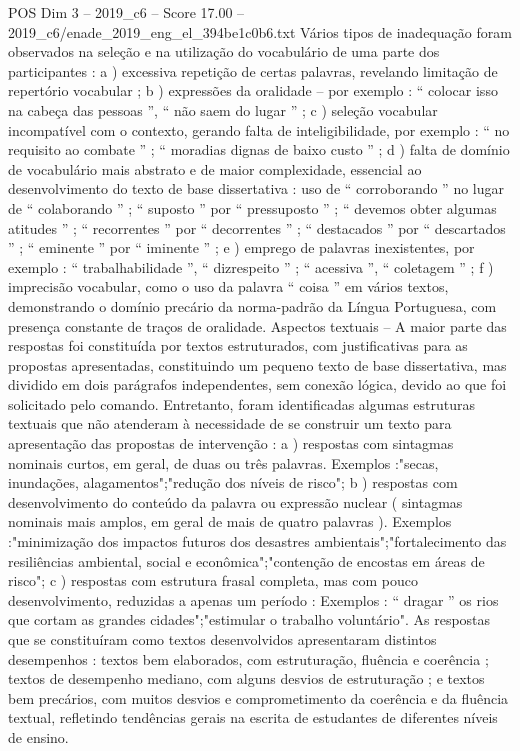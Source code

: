 \begin{textsample}{POS Dim 3 – 2019\_c6 – Score 17.00 – 2019\_c6/enade\_2019\_eng\_el\_394be1c0b6.txt}
Vários tipos de inadequação foram observados na seleção e na utilização do vocabulário de uma parte dos participantes : a ) excessiva repetição de certas palavras, revelando limitação de repertório vocabular ; b ) expressões da oralidade – por exemplo : “ colocar isso na cabeça das pessoas ”, “ não saem do lugar ” ; c ) seleção vocabular incompatível com o contexto, gerando falta de inteligibilidade, por exemplo : “ no requisito ao combate ” ; “ moradias dignas de baixo custo ” ; d ) falta de domínio de vocabulário mais abstrato e de maior complexidade, essencial ao desenvolvimento do texto de base dissertativa : uso de “ corroborando ” no lugar de “ colaborando ” ; “ suposto ” por “ pressuposto ” ; “ devemos obter algumas atitudes ” ; “ recorrentes ” por “ decorrentes ” ; “ destacados ” por “ descartados ” ; “ eminente ” por “ iminente ” ; e ) emprego de palavras inexistentes, por exemplo : “ trabalhabilidade ”, “ dizrespeito ” ; “ acessiva ”, “ coletagem ” ; f ) imprecisão vocabular, como o uso da palavra “ coisa ” em vários textos, demonstrando o domínio precário da norma-padrão da Língua Portuguesa, com presença constante de traços de oralidade.
Aspectos textuais – A maior parte das respostas foi constituída por textos estruturados, com justificativas para as propostas apresentadas, constituindo um pequeno texto de base dissertativa, mas dividido em dois parágrafos independentes, sem conexão lógica, devido ao que foi solicitado pelo comando.
Entretanto, foram identificadas algumas estruturas textuais que não atenderam à necessidade de se construir um texto para apresentação das propostas de intervenção : a ) respostas com sintagmas nominais curtos, em geral, de duas ou três palavras.
Exemplos :"secas, inundações, alagamentos";"redução dos níveis de risco"; b ) respostas com desenvolvimento do conteúdo da palavra ou expressão nuclear ( sintagmas nominais mais amplos, em geral de mais de quatro palavras ).
Exemplos :"minimização dos impactos futuros dos desastres ambientais";"fortalecimento das resiliências ambiental, social e econômica";"contenção de encostas em áreas de risco"; c ) respostas com estrutura frasal completa, mas com pouco desenvolvimento, reduzidas a apenas um período : Exemplos : “ dragar ” os rios que cortam as grandes cidades";"estimular o trabalho voluntário".
As respostas que se constituíram como textos desenvolvidos apresentaram distintos desempenhos : textos bem elaborados, com estruturação, fluência e coerência ; textos de desempenho mediano, com alguns desvios de estruturação ; e textos bem precários, com muitos desvios e comprometimento da coerência e da fluência textual, refletindo tendências gerais na escrita de estudantes de diferentes níveis de ensino.

\end{textsample}
